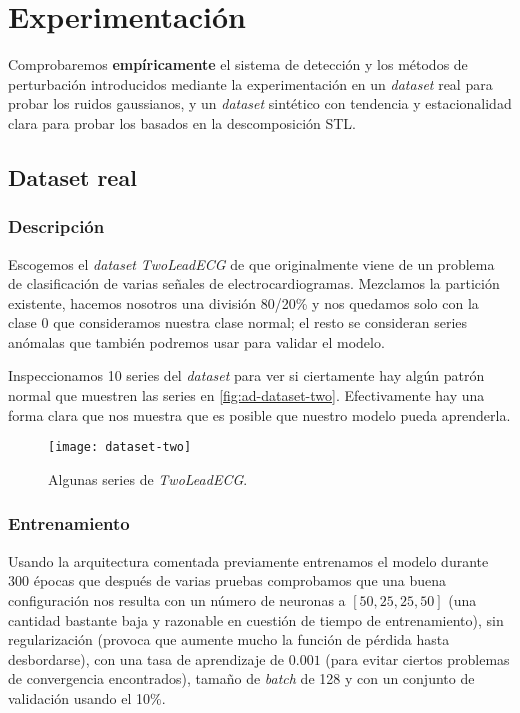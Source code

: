 \chapter{Experimentación}\label{ch:ad-experimentacion}

Comprobaremos \textbf{empíricamente} el sistema de detección y los métodos de perturbación introducidos mediante la experimentación en un \emph{dataset} real para probar los ruidos gaussianos, y un \emph{dataset} sintético con tendencia y estacionalidad clara para probar los basados en la descomposición STL.

\section{Dataset real}

\subsection{Descripción}

Escogemos el \emph{dataset} \emph{TwoLeadECG} de \cite{bagnall2020ts} que originalmente viene de un problema de clasificación de varias señales de electrocardiogramas. Mezclamos la partición existente, hacemos nosotros una división 80/20\% y nos quedamos solo con la clase 0 que consideramos nuestra clase normal; el resto se consideran series anómalas que también podremos usar para validar el modelo.

Inspeccionamos 10 series del \emph{dataset} para ver si ciertamente hay algún patrón normal que muestren las series en \autoref{fig:ad-dataset-two}. Efectivamente hay una forma clara que nos muestra que es posible que nuestro modelo pueda aprenderla.

\begin{figure}[htpb]
  \centering
  \texttt{[image: dataset-two]}
  \caption{Algunas series de \emph{TwoLeadECG}.}
  \label{fig:ad-dataset-two}
\end{figure}

\subsection{Entrenamiento}

Usando la arquitectura comentada previamente entrenamos el modelo durante 300 épocas que después de varias pruebas comprobamos que una buena configuración nos resulta con un número de neuronas a $[50, 25, 25, 50]$ (una cantidad bastante baja y razonable en cuestión de tiempo de entrenamiento), sin regularización (provoca que aumente mucho la función de pérdida hasta desbordarse), con una tasa de aprendizaje de $0.001$ (para evitar ciertos problemas de convergencia encontrados), tamaño de \emph{batch} de 128 y con un conjunto de validación usando el 10\%.

